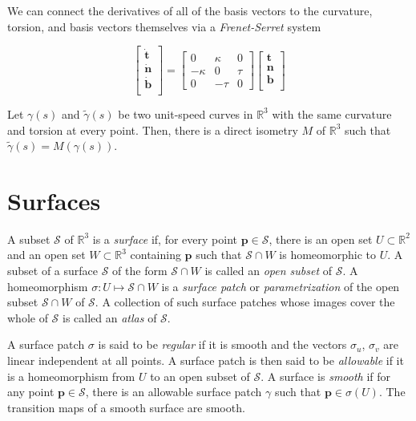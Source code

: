 \documentclass[12pt]{article}
\begin{document}
\begin{multicols*}{2}
We can connect the derivatives of all of the basis vectors to the curvature, torsion, and basis vectors themselves via a \textit{Frenet-Serret} system

\[
\left[\begin{array}{c}
    \dot{\mathbf{t}}\\
    \dot{\mathbf{n}}\\
    \dot{\mathbf{b}}\\
\end{array}\right] =   
\left[\begin{array}{ccc}
    0 & \kappa & 0\\
    -\kappa & 0 & \tau\\
    0 & -\tau & 0
\end{array}\right]
\left[\begin{array}{c}
    {\mathbf{t}}\\
    {\mathbf{n}}\\
    {\mathbf{b}}\\
\end{array}\right]
\]

Let $\gamma(s)$ and $\tilde{\gamma}(s)$ be two unit-speed curves in $\mathbb{R}^3$ with the same curvature and torsion at every point. Then, there is a direct isometry $M$ of $\mathbb{R}^3$ such that $\tilde{\gamma}(s) = M(\gamma(s))$.

\section*{Surfaces}

A subset $\mathcal{S}$ of $\mathbb{R}^3$ is a \textit{surface} if, for every point $\mathbf{p} \in \mathcal{S}$, there is an open set $U \subset \mathbb{R}^2$ and an open set $W \subset \mathbb{R}^3$ containing $\mathbf{p}$ such that $\mathcal{S} \cap W$ is homeomorphic to $U$. A subset of a surface $\mathcal{S}$ of the form $\mathcal{S}\cap W$ is called an \textit{open subset} of $\mathcal{S}$. A homeomorphism $\sigma : U \mapsto \mathcal{S}\cap W$ is a \textit{surface patch} or \textit{parametrization} of the open subset $\mathcal{S} \cap W$ of $\mathcal{S}$. A collection of such surface patches whose images cover the whole of $\mathcal{S}$ is called an \textit{atlas} of $\mathcal{S}$.

A surface patch $\sigma$ is said to be \textit{regular} if it is smooth and the vectors $\sigma_u$, $\sigma_v$ are linear independent at all points. A surface patch is then said to be \textit{allowable} if it is a homeomorphism from $U$ to an open subset of $\mathcal{S}$. A surface is \textit{smooth} if for any point $\mathbf{p} \in \mathcal{S}$, there is an allowable surface patch $\gamma$ such that $\mathbf{p} \in \sigma(U)$. The transition maps of a smooth surface are smooth.


\end{multicols*}
\end{document}
